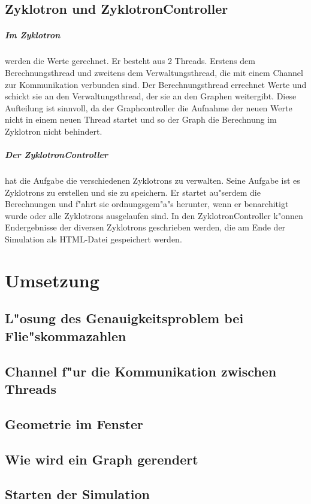 \documentclass[14pt, a4paper]{report}
\begin{document}
\section{Zyklotron und ZyklotronController}
\paragraph{Im Zyklotron} werden die Werte gerechnet. Er besteht aus 2 Threads. Erstens
dem Berechnungsthread und zweitens dem Verwaltungsthread, die mit einem Channel zur
Kommunikation verbunden sind. Der Berechnungsthread errechnet Werte und schickt sie an
den Verwaltungsthread, der sie an den Graphen weitergibt. Diese Aufteilung ist sinnvoll,
da der Graphcontroller die Aufnahme der neuen Werte nicht in einem neuen Thread startet
und so der Graph die Berechnung im Zyklotron nicht behindert.

\paragraph{Der ZyklotronController} hat die Aufgabe die verschiedenen Zyklotrons zu
verwalten. Seine Aufgabe ist es Zyklotrons zu erstellen und sie zu speichern. Er startet
au"serdem die Berechnungen und f"ahrt sie ordnungsgem"a"s herunter, wenn er 
benarchitigt wurde oder alle Zyklotrons ausgelaufen sind. In den ZyklotronController
k"onnen Endergebnisse der diversen Zyklotrons geschrieben werden, die am Ende der 
Simulation als HTML-Datei gespeichert werden.

\chapter{Umsetzung}
\section{L"osung des Genauigkeitsproblem bei Flie"skommazahlen}
\section{Channel f"ur die Kommunikation zwischen Threads}
\section{Geometrie im Fenster}
\section{Wie wird ein Graph gerendert}
\section{Starten der Simulation}
\end{document}
